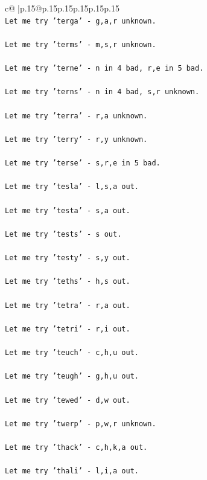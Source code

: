 \documentclass{article}
\begin{document}
{\begin{supertabular}{c@{$\;$}|p{.15\linewidth}@{}p{.15\linewidth}p{.15\linewidth}p{.15\linewidth}p{.15\linewidth}p{.15\linewidth}}
{{{\\ 
\texttt{Let me try 'terga' {-} g,a,r unknown. } \\
\\ 
\texttt{Let me try 'terms' {-} m,s,r unknown. } \\
\\ 
\texttt{Let me try 'terne' {-} n in 4 bad, r,e in 5 bad. } \\
\\ 
\texttt{Let me try 'terns' {-} n in 4 bad, s,r unknown. } \\
\\ 
\texttt{Let me try 'terra' {-} r,a unknown. } \\
\\ 
\texttt{Let me try 'terry' {-} r,y unknown. } \\
\\ 
\texttt{Let me try 'terse' {-} s,r,e in 5 bad. } \\
\\ 
\texttt{Let me try 'tesla' {-} l,s,a out. } \\
\\ 
\texttt{Let me try 'testa' {-} s,a out. } \\
\\ 
\texttt{Let me try 'tests' {-} s out. } \\
\\ 
\texttt{Let me try 'testy' {-} s,y out. } \\
\\ 
\texttt{Let me try 'teths' {-} h,s out. } \\
\\ 
\texttt{Let me try 'tetra' {-} r,a out. } \\
\\ 
\texttt{Let me try 'tetri' {-} r,i out. } \\
\\ 
\texttt{Let me try 'teuch' {-} c,h,u out. } \\
\\ 
\texttt{Let me try 'teugh' {-} g,h,u out. } \\
\\ 
\texttt{Let me try 'tewed' {-} d,w out. } \\
\\ 
\texttt{Let me try 'twerp' {-} p,w,r unknown. } \\
\\ 
\texttt{Let me try 'thack' {-} c,h,k,a out. } \\
\\ 
\texttt{Let me try 'thali' {-} l,i,a out. } \\
}}}
\end{supertabular}}
\end{document}
